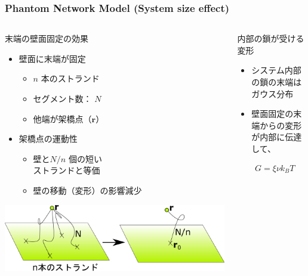 \documentclass[12pt, dvipdfmx]{beamer}
\begin{document}
\begin{frame}
	\frametitle{Phantom Network Model (System size effect)}
		\begin{columns}[totalwidth=1\textwidth]
				\begin{block}{末端の壁面固定の効果}
				\begin{itemize}
					\item 壁面に末端が固定
						\begin{itemize}
							\item $n$ 本のストランド
							\item セグメント数： $N$
							\item 他端が架橋点（$\bm{r}$）
						\end{itemize}
					\item 架橋点の運動性
						\begin{itemize}
							\item 壁と$N/n$ 個の短い\\ストランドと等価
							\item 壁の移動（変形）の影響減少
						\end{itemize}
				\end{itemize}
				\begin{center}
					\includegraphics[width=.8\textwidth]{phantom-1.png}
				\end{center}
				\end{block}
				\begin{exampleblock}{内部の鎖が受ける変形}
					\begin{itemize}
						\item システム内部の鎖の末端はガウス分布
						\item 壁面固定の末端からの変形が内部に伝達して、
					\end{itemize}
					\tiny
					\begin{align*}
						&G=\xi \nu k_BT \\

\end{align*}
\end{exampleblock}
\end{columns}
\end{frame}
\end{document}
